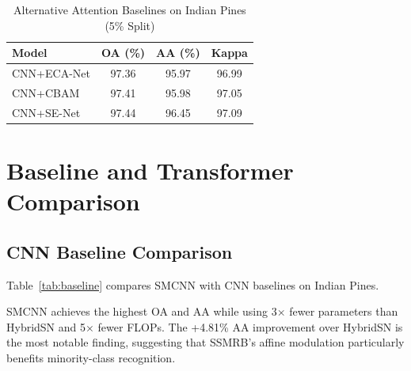 \documentclass[conference]{IEEEtran}
\begin{document}
\begin{table}[!h]
\caption{Alternative Attention Baselines on Indian Pines (5\% Split)}
\label{tab:attention_baselines}
\centering
\begin{tabular}{lccc}
\toprule
\textbf{Model} & \textbf{OA (\%)} & \textbf{AA (\%)} & \textbf{Kappa} \\
\midrule
CNN+ECA-Net & 97.36 & 95.97 & 96.99 \\
CNN+CBAM & 97.41 & 95.98 & 97.05 \\
CNN+SE-Net & 97.44 & 96.45 & 97.09 \\
\bottomrule
\end{tabular}
\end{table}

\section{Baseline and Transformer Comparison}

\subsection{CNN Baseline Comparison}

Table~\ref{tab:baseline} compares SMCNN with CNN baselines on Indian Pines.

\begin{table}[!t]
\caption{Baseline Comparison on Indian Pines}
\label{tab:baseline}
\centering
{}
\end{table}

SMCNN achieves the highest OA and AA while using 3$\times$ fewer parameters than HybridSN and 5$\times$ fewer FLOPs. The +4.81\% AA improvement over HybridSN is the most notable finding, suggesting that SSMRB's affine modulation particularly benefits minority-class recognition.
\end{document}
